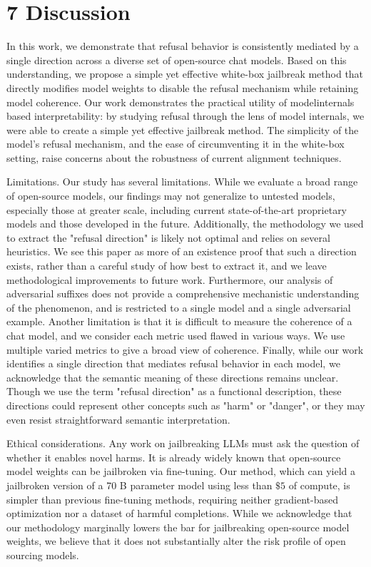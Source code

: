 \documentclass[10pt]{article}
\begin{document}
\section*{7 Discussion}
In this work, we demonstrate that refusal behavior is consistently mediated by a single direction across a diverse set of open-source chat models. Based on this understanding, we propose a simple yet effective white-box jailbreak method that directly modifies model weights to disable the refusal mechanism while retaining model coherence. Our work demonstrates the practical utility of modelinternals based interpretability: by studying refusal through the lens of model internals, we were able to create a simple yet effective jailbreak method. The simplicity of the model's refusal mechanism, and the ease of circumventing it in the white-box setting, raise concerns about the robustness of current alignment techniques.

Limitations. Our study has several limitations. While we evaluate a broad range of open-source models, our findings may not generalize to untested models, especially those at greater scale, including current state-of-the-art proprietary models and those developed in the future. Additionally, the methodology we used to extract the "refusal direction" is likely not optimal and relies on several heuristics. We see this paper as more of an existence proof that such a direction exists, rather than a careful study of how best to extract it, and we leave methodological improvements to future work. Furthermore, our analysis of adversarial suffixes does not provide a comprehensive mechanistic understanding of the phenomenon, and is restricted to a single model and a single adversarial example. Another limitation is that it is difficult to measure the coherence of a chat model, and we consider each metric used flawed in various ways. We use multiple varied metrics to give a broad view of coherence. Finally, while our work identifies a single direction that mediates refusal behavior in each model, we acknowledge that the semantic meaning of these directions remains unclear. Though we use the term "refusal direction" as a functional description, these directions could represent other concepts such as "harm" or "danger", or they may even resist straightforward semantic interpretation.

Ethical considerations. Any work on jailbreaking LLMs must ask the question of whether it enables novel harms. It is already widely known that open-source model weights can be jailbroken via fine-tuning. Our method, which can yield a jailbroken version of a 70 B parameter model using less than $\$ 5$ of compute, is simpler than previous fine-tuning methods, requiring neither gradient-based optimization nor a dataset of harmful completions. While we acknowledge that our methodology marginally lowers the bar for jailbreaking open-source model weights, we believe that it does not substantially alter the risk profile of open sourcing models.
\end{document}
